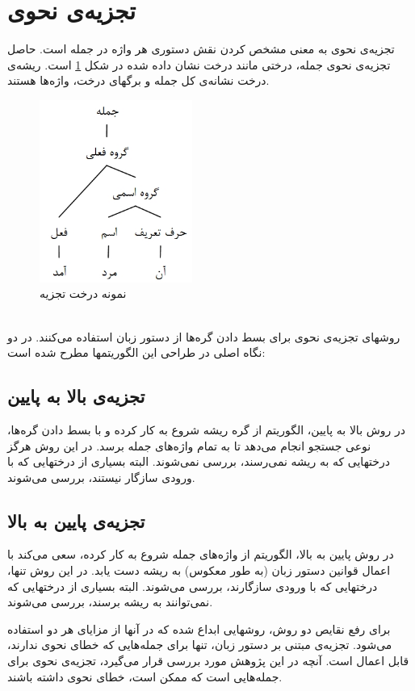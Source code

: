 \documentclass{report}
\begin{document}
\section{تجزیه‌ی نحوی}
تجزیه‌ی نحوی به معنی مشخص کردن نقش دستوری هر واژه در جمله است. حاصل تجزیه‌ی نحوی جمله، درختی مانند درخت نشان داده شده در شکل \ref{parsing} است. ریشه‌ی درخت نشانه‌ی کل جمله و برگهای درخت، واژه‌ها هستند.
\begin{figure}[h]
\centerline{\includegraphics[width=5cm]{tree}}
\caption{\label{parsing} نمونه درخت تجزیه}
\end{figure}
\\
روشهای تجزیه‌ی نحوی برای بسط دادن گره‌ها از دستور زبان استفاده می‌کنند. در \cite{ct2} دو نگاه اصلی در طراحی این الگوریتمها مطرح شده است:

\subsection{تجزیه‌ی بالا به پایین}
در روش بالا به پایین، الگوریتم از گره ریشه شروع به کار کرده و با بسط دادن گره‌ها، نوعی جستجو انجام می‌دهد تا به تمام واژه‌های جمله برسد. در این روش هرگز درختهایی که به ریشه نمی‌رسند، بررسی نمی‌شوند. البته بسیاری از درختهایی که با ورودی سازگار نیستند، بررسی می‌شوند.
\subsection{تجزیه‌ی پایین به بالا}
در روش پایین به بالا، الگوریتم از واژه‌های جمله شروع به کار کرده، سعی می‌کند با اعمال قوانین دستور زبان (‌به طور معکوس‌) به ریشه دست‌ یابد. در این روش تنها، درختهایی که با ورودی سازگارند، بررسی می‌شوند. البته بسیاری از درختهایی که نمی‌توانند به ریشه برسند، بررسی می‌شوند.

برای رفع نقایص دو روش، روشهایی ابداع شده که در آنها از مزایای هر دو استفاده می‌شود. تجزیه‌ی مبتنی بر دستور زبان، تنها برای جمله‌هایی که خطای نحوی ندارند، قابل اعمال است. آنچه در این پژوهش مورد بررسی قرار می‌گیرد، تجزیه‌ی نحوی برای جمله‌هایی است که ممکن است، خطای نحوی داشته باشند.
\end{document}
